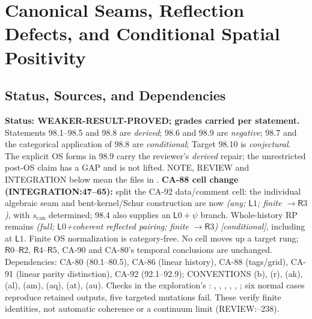 
\section{Canonical Seams, Reflection Defects, and Conditional Spatial Positivity}
\label{sec:canonical-seams-reflection-coherence}

\subsection{Status, Sources, and Dependencies}

\textbf{Status: WEAKER-RESULT-PROVED; grades carried per statement.}
Statements 98.1--98.5 and 98.8 are \emph{derived}; 98.6 and 98.9 are \emph{negative};
98.7 and the categorical application of 98.8 are \emph{conditional}; Target 98.10 is \emph{conjectural}.
The explicit OS forms in 98.9 carry the reviewer's \emph{derived} repair; the unrestricted post-OS
claim has a GAP and is not lifted. NOTE, REVIEW and INTEGRATION below mean the files in
.
\textbf{CA-88 cell change (INTEGRATION:47--65):} split the CA-92 data/comment cell:
the individual algebraic seam and bent-kernel/Schur construction are now
\emph{(any; \(\mathsf L1\); finite \(\to\mathsf R3\))}, with \(s_{\mathrm{can}}\) determined;
98.4 also supplies an \(\mathsf L0+\psi\) branch. Whole-history RP remains
\emph{(full; \(\mathsf L0\)+coherent reflected pairing; finite \(\to\mathsf R3\)) [conditional]},
including at \(\mathsf L1\). Finite OS normalization is category-free. No cell moves up a target rung;
\(\mathsf R0\)--\(\mathsf R2\), \(\mathsf R4\)--\(\mathsf R5\), CA-90 and CA-80's temporal conclusions are unchanged.
Dependencies: CA-80 (80.1--80.5), CA-86 (linear history), CA-88 (tags/grid), CA-91 (linear parity distinction),
CA-92 (92.1--92.9); CONVENTIONS (b), (r), (ak), (al), (am), (aq), (at), (au).
Checks in the exploration's : , ,
, , , ;
six normal cases reproduce retained outputs, five targeted mutations fail. These verify finite identities,
not automatic coherence or a continuum limit (REVIEW:--238).

